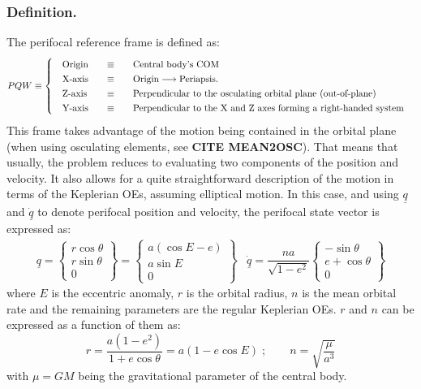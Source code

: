 		\subsubsection{Definition.}
		\indent The perifocal reference frame is defined as:
		\[
		\arraycolsep=10pt
		\def\arraystretch{1.3}
		PQW\equiv\left\{
		\begin{array}{lll}
		\text{Origin} 	& \equiv 	& \text{Central body's COM} \\
		\text{X-axis} 	& \equiv 	& \text{Origin} \longrightarrow \text{Periapsis.} \\
		\text{Z-axis} 	& \equiv 	& \text{Perpendicular to the osculating orbital plane (out-of-plane)} \\
		\text{Y-axis} 	& \equiv 	& \text{Perpendicular to the X and Z axes forming a right-handed system} \\
		\end{array}
		\right.
		\]
		\indent This frame takes advantage of the motion being contained in the orbital plane (when using osculating elements, see \textbf{CITE MEAN2OSC}). That means that usually, the problem reduces to evaluating two components of the position and velocity. It also allows for a quite straightforward description of the motion in terms of the Keplerian OEs, assuming elliptical motion. In this case, and using $\underline{q}$ and $\underline{\dot{q}}$ to denote perifocal position and velocity, the perifocal state vector is expressed as:
		\[\begin{array}{cc}
		\underline{q} = \left\{ 
		\begin{array}{c}
		r \cos \theta \\
		r \sin \theta \\
		0
		\end{array}				
		\right\} = 
		\left\{ 
		\begin{array}{c}
		a \left( \cos E - e \right) \\
		a \sin E\\
		0
		\end{array}				
		\right\} 		&
		\underline{\dot{q}} = \dfrac{na}{\sqrt{1-e^2}}
		\left\{ 
		\begin{array}{c}
		-\sin\theta\\
		e + \cos \theta\\
		0
		\end{array}				
		\right\}		
		\end{array}
		\]
		\noindent where $E$ is the eccentric anomaly, $r$ is the orbital radius, $n$ is the mean orbital rate and the remaining parameters are the regular Keplerian OEs. $r$ and $n$ can be expressed as a function of them as:
		\[
		r = \dfrac{a (1 - e^2)}{1 + e \cos\theta} = a (1 - e\cos E) \; ; \qquad n = \sqrt{\dfrac{\mu }{a^3}}		
		\]
		\noindent with $\mu = GM$ being the gravitational parameter of the central body.
